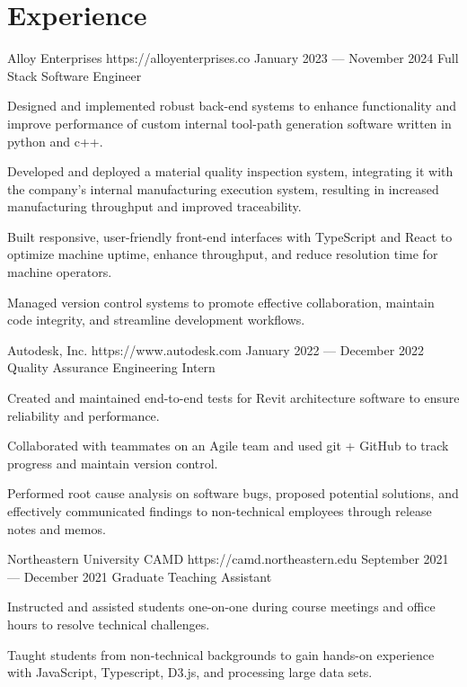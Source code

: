 \documentclass{resume}
\begin{document}
\smallskip

\section{Experience}

\employer
    {Alloy Enterprises}
    {https://alloyenterprises.co}
    {January 2023 --- November 2024}
    {Full Stack Software Engineer}
    {\begin{jobitems}
        \item Designed and implemented robust back-end systems to enhance functionality and improve performance of custom internal tool-path generation software written in python and c++.
        \item Developed and deployed a material quality inspection system, integrating it with the company's internal manufacturing execution system, resulting in increased manufacturing throughput and improved traceability.
        \item Built responsive, user-friendly front-end interfaces with TypeScript and React to optimize machine uptime, enhance throughput, and reduce resolution time for machine operators.
        \item Managed version control systems to promote effective collaboration, maintain code integrity, and streamline development workflows.
    \end{jobitems}}

\employer
    {Autodesk, Inc.}
    {https://www.autodesk.com}
    {January 2022 --- December 2022}
    {Quality Assurance Engineering Intern}
    {\begin{jobitems}
        \item Created and maintained end-to-end tests for Revit architecture software to ensure reliability and performance.
        \item Collaborated with teammates on an Agile team and used git + GitHub to track progress and maintain version control.
        \item Performed root cause analysis on software bugs, proposed potential solutions, and effectively communicated findings to non-technical employees through release notes and memos.
    \end{jobitems}}

\employer
    {Northeastern University CAMD}
    {https://camd.northeastern.edu}
    {September 2021--- December 2021}
    {Graduate Teaching Assistant}
    {\begin{jobitems}
        \item Instructed and assisted students one-on-one during course meetings and office hours to resolve technical challenges.
        \item Taught students from non-technical backgrounds to gain hands-on experience with JavaScript, Typescript, D3.js, and processing large data sets.
    \end{jobitems}}
\end{document}
